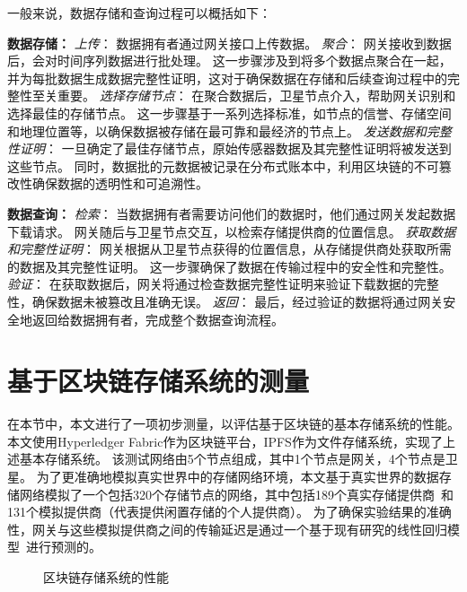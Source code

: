 一般来说，数据存储和查询过程可以概括如下：

\textbf{数据存储：}
\textit{上传}：
数据拥有者通过网关接口上传数据。
\textit{聚合}：
网关接收到数据后，会对时间序列数据进行批处理。
这一步骤涉及到将多个数据点聚合在一起，并为每批数据生成数据完整性证明，这对于确保数据在存储和后续查询过程中的完整性至关重要。
\textit{选择存储节点}：
在聚合数据后，卫星节点介入，帮助网关识别和选择最佳的存储节点。
这一步骤基于一系列选择标准，如节点的信誉、存储空间和地理位置等，以确保数据被存储在最可靠和最经济的节点上。
\textit{发送数据和完整性证明}：
一旦确定了最佳存储节点，原始传感器数据及其完整性证明将被发送到这些节点。
同时，数据批的元数据被记录在分布式账本中，利用区块链的不可篡改性确保数据的透明性和可追溯性。

\textbf{数据查询：}
\textit{检索}：
当数据拥有者需要访问他们的数据时，他们通过网关发起数据下载请求。
网关随后与卫星节点交互，以检索存储提供商的位置信息。
\textit{获取数据和完整性证明}：
网关根据从卫星节点获得的位置信息，从存储提供商处获取所需的数据及其完整性证明。
这一步骤确保了数据在传输过程中的安全性和完整性。
\textit{验证}：
在获取数据后，网关将通过检查数据完整性证明来验证下载数据的完整性，确保数据未被篡改且准确无误。
\textit{返回}：
最后，经过验证的数据将通过网关安全地返回给数据拥有者，完成整个数据查询流程。

\section{基于区块链存储系统的测量}
在本节中，本文进行了一项初步测量，以评估基于区块链的基本存储系统的性能。
本文使用Hyperledger Fabric作为区块链平台，IPFS作为文件存储系统，实现了上述基本存储系统。
该测试网络由5个节点组成，其中1个节点是网关，4个节点是卫星。
为了更准确地模拟真实世界中的存储网络环境，本文基于真实世界的数据存储网络模拟了一个包括320个存储节点的网络，其中包括189个真实存储提供商~\cite{corneo2021surrounded}和131个模拟提供商（代表提供闲置存储的个人提供商）。
为了确保实验结果的准确性，网关与这些模拟提供商之间的传输延迟是通过一个基于现有研究的线性回归模型~\cite{ziviani2005improving}进行预测的。
\begin{figure*}[t]
    \centering
    \begin{minipage}{1\linewidth}
	    \centering
        \hfill
        \caption{区块链存储系统的性能} 
    \end{minipage}
\end{figure*}

